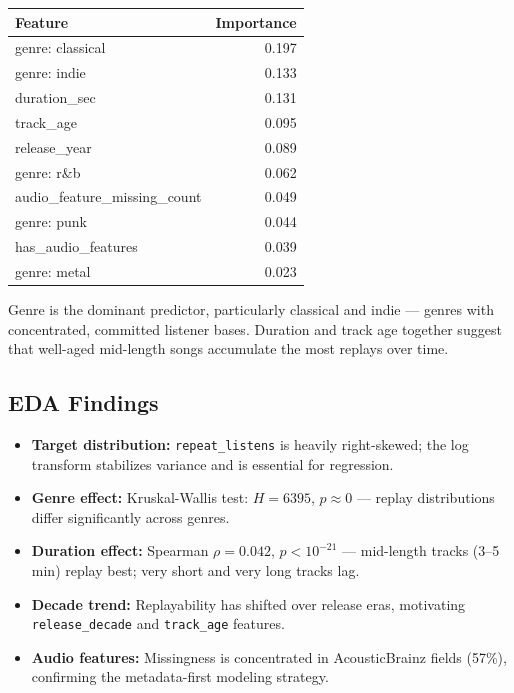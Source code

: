 \documentclass[11pt, letterpaper]{article}
\begin{document}
\begin{center}
\begin{tabular}{lr}
\toprule
\textbf{Feature} & \textbf{Importance} \\
\midrule
genre: classical      & 0.197 \\
genre: indie          & 0.133 \\
duration\_sec         & 0.131 \\
track\_age            & 0.095 \\
release\_year         & 0.089 \\
genre: r\&b           & 0.062 \\
audio\_feature\_missing\_count & 0.049 \\
genre: punk           & 0.044 \\
has\_audio\_features  & 0.039 \\
genre: metal          & 0.023 \\
\bottomrule
\end{tabular}
\end{center}

Genre is the dominant predictor, particularly classical and indie — genres
with concentrated, committed listener bases. Duration and track age together
suggest that well-aged mid-length songs accumulate the most replays over time.

\subsection{EDA Findings}

\begin{itemize}[noitemsep]
    \item \textbf{Target distribution:} \texttt{repeat\_listens} is heavily right-skewed; the log transform stabilizes variance and is essential for regression.
    \item \textbf{Genre effect:} Kruskal-Wallis test: $H = 6395$, $p \approx 0$ — replay distributions differ significantly across genres.
    \item \textbf{Duration effect:} Spearman $\rho = 0.042$, $p < 10^{-21}$ — mid-length tracks (3–5 min) replay best; very short and very long tracks lag.
    \item \textbf{Decade trend:} Replayability has shifted over release eras, motivating \texttt{release\_decade} and \texttt{track\_age} features.
    \item \textbf{Audio features:} Missingness is concentrated in AcousticBrainz fields (57\%), confirming the metadata-first modeling strategy.
\end{itemize}
\end{document}
